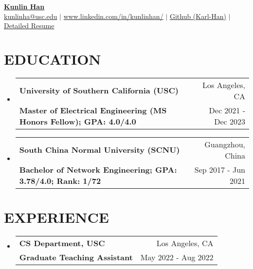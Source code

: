 \documentclass[letterpaper,11pt]{article}
\makeatletter
\newcommand{\resumeSubheading}[4]{
  \vspace{-1pt}\item
    \begin{tabular*}{0.97\textwidth}[t]{l@{\extracolsep{\fill}}r}
      \textbf{#1} & #2 \\
      \textbf{\small#3} & \small{#4} \\
    \end{tabular*}\vspace{-10pt}
}
\newcommand{\resumeSubHeadingListStart}{\begin{itemize}[leftmargin=*]}
\newcommand{\resumeSubHeadingListEnd}{\end{itemize}\vspace{-5pt}}
\makeatother
\begin{document}
\textbf{\href{https://www.linkedin.com/in/kunlinhan/}{\LARGE {Kunlin Han}}} \\
{
    \href{mailto:{kunlinha@usc.edu}}{{kunlinha@usc.edu}} $|$ \href{https://www.linkedin.com/in/kunlinhan/}{www.linkedin.com/in/kunlinhan/} $|$ \href{https://github.com/Karl-Han}{Github (Karl-Han)}  $|$ \href{https://www.iwktd.com/}{Detailed Resume} 
}\section{EDUCATION}
\resumeSubHeadingListStart
\resumeSubheading
    {University of Southern California (USC)}{Los Angeles, CA}
    {Master of Electrical Engineering (MS Honors Fellow); GPA: 4.0/4.0
}{Dec 2021 - Dec 2023}
\resumeSubheading
    {South China Normal University (SCNU)}{Guangzhou, China}
    {Bachelor of Network Engineering; GPA: 3.78/4.0; Rank: 1/72
}{Sep 2017 - Jun 2021}
\resumeSubHeadingListEnd



\section{EXPERIENCE}
\resumeSubHeadingListStart
\resumeSubheading
    {CS Department, USC}{Los Angeles, CA}
    {Graduate Teaching Assistant}{May 2022 - Aug 2022}
\resumeSubHeadingListEnd
\end{document}

